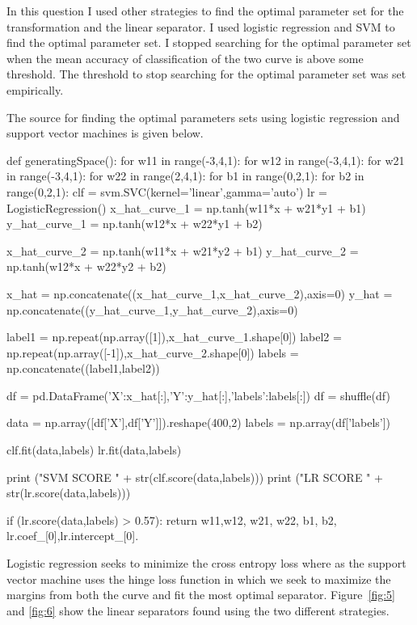 \documentclass[12pt]{report}
\begin{document}
In this question I used other strategies to find the optimal parameter set for the transformation and the linear separator. I used logistic regression and SVM to find the optimal parameter set. I stopped searching for the optimal parameter set when the mean accuracy of classification of the two curve is above some threshold. The threshold to stop searching for the optimal parameter set was set empirically. 

The source for finding the optimal parameters sets using logistic regression and support vector machines is given below. 

\begin{python}
	def generatingSpace():
		for w11 in range(-3,4,1):
			for w12 in range(-3,4,1):
				for w21 in range(-3,4,1):
					for w22 in range(2,4,1):
						for b1 in range(0,2,1):
							for b2 in range(0,2,1):
								clf = svm.SVC(kernel='linear',gamma='auto')
								lr = LogisticRegression()
								x_hat_curve_1 = np.tanh(w11*x + w21*y1 + b1)
								y_hat_curve_1 = np.tanh(w12*x + w22*y1 + b2)
								
								x_hat_curve_2 = np.tanh(w11*x + w21*y2 + b1)
								y_hat_curve_2 = np.tanh(w12*x + w22*y2 + b2)
								
								
								x_hat = np.concatenate((x_hat_curve_1,x_hat_curve_2),axis=0)
								y_hat = np.concatenate((y_hat_curve_1,y_hat_curve_2),axis=0)	
								
								
								label1 = np.repeat(np.array([1]),x_hat_curve_1.shape[0])
								label2 = np.repeat(np.array([-1]),x_hat_curve_2.shape[0])
								labels = np.concatenate((label1,label2))
								
								df = pd.DataFrame({'X':x_hat[:],'Y':y_hat[:],'labels':labels[:]})
								df = shuffle(df)
								
								
								data = np.array([df['X'],df['Y']]).reshape(400,2)
								labels = np.array(df['labels'])
								
								clf.fit(data,labels) 
								lr.fit(data,labels)
								
								print ("SVM SCORE " + str(clf.score(data,labels)))
								print ("LR SCORE " + str(lr.score(data,labels)))
								
								if (lr.score(data,labels) > 0.57):
									return w11,w12, w21, w22, b1, b2, lr.coef_[0],lr.intercept_[0].
\end{python} 

Logistic regression seeks to minimize the cross entropy loss where as the support vector machine uses the hinge loss function in which we seek to maximize the margins from both the curve and fit the most optimal separator. Figure~\ref{fig:5} and \ref{fig:6} show the linear separators found using the two different strategies.
\end{document}
